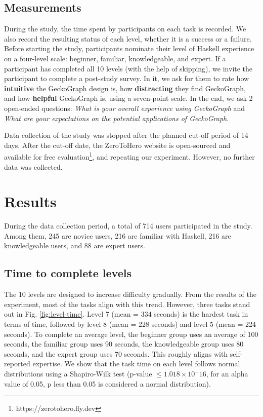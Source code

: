 \documentclass[preprint,12pt]{elsarticle}
\begin{document}
\subsection{Measurements}
During the study, the time spent by participants on each task is recorded. We also record the resulting status of each level, whether it is a success or a failure. Before starting the study, participants nominate their level of Haskell experience on a four-level scale: beginner, familiar,  knowledgeable, and expert.  If a participant has completed all 10 levels (with the help of skipping), we invite the participant to complete a post-study survey. In it, we ask for them to rate how {\bf intuitive} the GeckoGraph design is, how {\bf distracting} they find GeckoGraph, and how {\bf helpful} GeckoGraph is, using a seven-point scale. In the end, we ask 2 open-ended questions: {\it What is your overall experience using GeckoGraph} and {\it What are your expectations on the potential applications of GeckoGraph}.

Data collection of the study was stopped after the planned cut-off period of 14 days. After the cut-off date, the ZeroToHero website is open-sourced and available for free evaluation\footnote{https://zerotohero.fly.dev}, and repeating our experiment. However, no further data was collected. 

\section{Results}

During the data collection period, a total of 714 users participated in the study. Among them, 245 are novice users, 216 are familiar with Haskell, 216 are knowledgeable users, and 88 are expert users. 

\subsection{Time to complete levels}

The 10 levels are designed to increase difficulty gradually. From the results of the experiment, most of the tasks align with this trend. However, three tasks stand out in Fig. \ref{fig:level-time}.  Level 7 (mean = 334 seconds) is the hardest task in terms of time, followed by level 8 (mean = 228 seconds) and level 5 (mean = 224 seconds). To complete an average level, the beginner group uses an average of 100 seconds, the familiar group uses 90 seconds, the knowledgeable group uses 80 seconds, and the expert group uses 70 seconds. This roughly aligns with self-reported expertise. We show that the task time on each level follows normal distributions using a Shapiro-Wilk test \cite{Shaphiro1965-dx} (p-value  $ \leq 1.018 \times 10^-16$, for an alpha value of 0.05, p less than 0.05 is considered a normal distribution).
\end{document}
